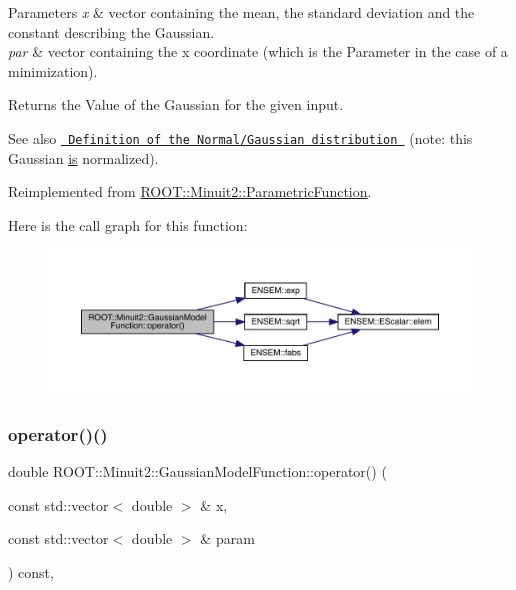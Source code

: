 \begin{DoxyParams}{Parameters}
{\em x} & vector containing the mean, the standard deviation and the constant describing the Gaussian.\\
\hline
{\em par} & vector containing the x coordinate (which is the Parameter in the case of a minimization).\\
\hline
\end{DoxyParams}
\begin{DoxyReturn}{Returns}
the Value of the Gaussian for the given input.
\end{DoxyReturn}
\begin{DoxySeeAlso}{See also}
\href{http://mathworld.wolfram.com/NormalDistribution.html}{\texttt{ Definition of the Normal/\+Gaussian distribution }} (note\+: this Gaussian \mbox{\hyperlink{x_8cc_a81abbbdef81e25584a2eab888e643d3d}{is}} normalized). 
\end{DoxySeeAlso}


Reimplemented from \mbox{\hyperlink{classROOT_1_1Minuit2_1_1ParametricFunction_a5fab6e804e0f93bd593580f582b0f7c5}{R\+O\+O\+T\+::\+Minuit2\+::\+Parametric\+Function}}.

Here is the call graph for this function\+:
\nopagebreak
\begin{figure}[H]
\begin{center}
\leavevmode
\includegraphics[width=350pt]{d4/df6/classROOT_1_1Minuit2_1_1GaussianModelFunction_ab74ced8f50ef3831c8142de54877e726_cgraph}
\end{center}
\end{figure}
\mbox{\label{classROOT_1_1Minuit2_1_1GaussianModelFunction_ab74ced8f50ef3831c8142de54877e726}} 
\subsubsection{\texorpdfstring{operator()()}{operator()()}\hspace{0.1cm}{\footnotesize\ttfamily [4/4]}}
{\footnotesize\ttfamily double R\+O\+O\+T\+::\+Minuit2\+::\+Gaussian\+Model\+Function\+::operator() (\begin{DoxyParamCaption}\item[{const std\+::vector$<$ double $>$ \&}]{x,  }\item[{const std\+::vector$<$ double $>$ \&}]{param }\end{DoxyParamCaption}) const\hspace{0.3cm}{\ttfamily [inline]}, {\ttfamily [virtual]}}

